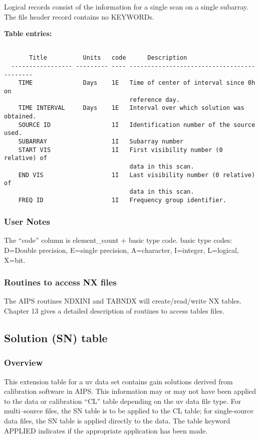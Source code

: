      Logical records consist of the information for a single scan on a
single subarray.  The file header record contains no KEYWORDs.

{\bf Table entries:}
\begin{verbatim}

       Title          Units   code      Description
  ----------------- --------- ---- -------------------------------------------
    TIME              Days    1E   Time of center of interval since 0h on
                                   reference day.
    TIME INTERVAL     Days    1E   Interval over which solution was obtained.
    SOURCE ID                 1I   Identification number of the source used.
    SUBARRAY                  1I   Subarray number
    START VIS                 1I   First visibility number (0 relative) of
                                   data in this scan.
    END VIS                   1I   Last visibility number (0 relative) of
                                   data in this scan.
    FREQ ID                   1I   Frequency group identifier.
\end{verbatim}

\subsubsection{User Notes}

  The ``code'' column is element\_count + basic type code.
basic type codes: D=Double precision, E=single precision, A=character,
I=integer, L=logical, X=bit.


\subsubsection{Routines to access NX files}
     The AIPS routines NDXINI and TABNDX
will create/read/write NX tables.  Chapter 13 gives a detailed
description of routines to access tables files.

\subsection{Solution (SN) table }
\subsubsection{Overview}

   This extension table for a uv data set contains gain solutions
derived  from calibration software in AIPS.  This information may or
may not have been applied to the data or calibration ``CL'' table
depending on the uv data file type. For multi--source files, the SN table
is to be applied to the CL table; for single-source data files, the SN
table is applied directly to the data.  The table keyword APPLIED
indicates if the appropriate application has been made.

